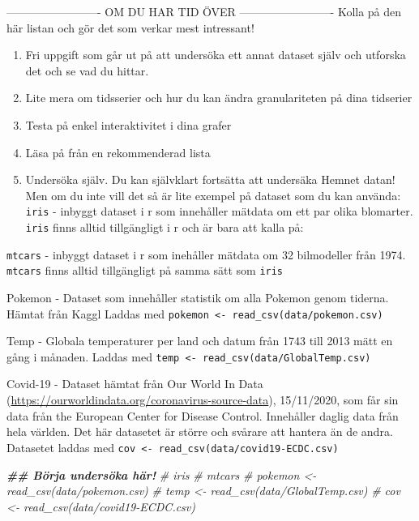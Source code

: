 \documentclass[
]{book}
\newenvironment{Shaded}{\begin{snugshade}}{\end{snugshade}}
\newcommand{\CommentTok}[1]{\textcolor[rgb]{0.56,0.35,0.01}{\textit{#1}}}
\newcommand{\DocumentationTok}[1]{\textcolor[rgb]{0.56,0.35,0.01}{\textbf{\textit{#1}}}}
\begin{document}
------------------------- OM DU HAR TID ÖVER -------------------------
Kolla på den här listan och gör det som verkar mest intressant!

\begin{enumerate}
\def\labelenumi{\arabic{enumi}.}
\item
  Fri uppgift som går ut på att undersöka ett annat dataset själv och utforska det och se vad du hittar.
\item
  Lite mera om tidsserier och hur du kan ändra granulariteten på dina tidserier
\item
  Testa på enkel interaktivitet i dina grafer
\item
  Läsa på från en rekommenderad lista
\item
  Undersöka själv.
  Du kan självklart fortsätta att undersäka Hemnet datan!
  Men om du inte vill det så är lite exempel på dataset som du kan använda:
  \texttt{iris} - inbyggt dataset i r som innehåller mätdata om ett par olika blomarter.
  \texttt{iris} finns alltid tillgängligt i r och är bara att kalla på:
\end{enumerate}

\texttt{mtcars} - inbyggt dataset i r som inehåller mätdata om 32 bilmodeller från 1974.
\texttt{mtcars} finns alltid tillgängligt på samma sätt som \texttt{iris}

Pokemon - Dataset som innehåller statistik om alla Pokemon genom tiderna. Hämtat från Kaggl
Laddas med \texttt{pokemon\ \textless{}-\ read\_csv(\textquotesingle{}data/pokemon.csv)}

Temp - Globala temperaturer per land och datum från 1743 till 2013 mätt en gång i månaden.
Laddas med \texttt{temp\ \textless{}-\ read\_csv(\textquotesingle{}data/GlobalTemp.csv\textquotesingle{})}

Covid-19 - Dataset hämtat från Our World In Data (\url{https://ourworldindata.org/coronavirus-source-data}), 15/11/2020,
som får sin data från the European Center for Disease Control.
Innehåller daglig data från hela världen.
Det här datasetet är större och svårare att hantera än de andra.
Datasetet laddas med \texttt{cov\ \textless{}-\ read\_csv(\textquotesingle{}data/covid19-ECDC.csv\textquotesingle{})}

\begin{Shaded}
\begin{Highlighting}[]
\DocumentationTok{\#\# Börja undersöka här!}
\CommentTok{\# iris}
\CommentTok{\# mtcars}
\CommentTok{\# pokemon \textless{}{-} read\_csv(\textquotesingle{}data/pokemon.csv\textquotesingle{})}
\CommentTok{\# temp \textless{}{-} read\_csv(\textquotesingle{}data/GlobalTemp.csv\textquotesingle{})}
\CommentTok{\# cov \textless{}{-} read\_csv(\textquotesingle{}data/covid19{-}ECDC.csv\textquotesingle{})}
\end{Highlighting}
\end{Shaded}
\end{document}
